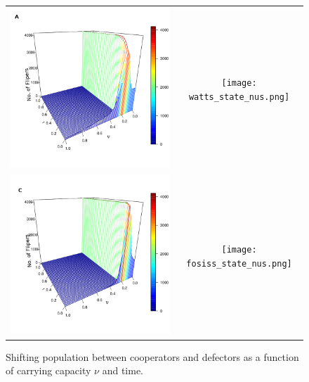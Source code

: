 \documentclass[11pt]{article}
\begin{document}
\begin{figure} [h!]
\begin{tabular}{cc}
\includegraphics[scale=0.28]{images/erdos_state_nus.png} & \texttt{[image: watts\_state\_nus.png]} \\
\includegraphics[scale=0.28]{images/barabasi_state_nus.png} & \texttt{[image: fosiss\_state\_nus.png]}
\end{tabular}
\caption{Shifting population between cooperators and defectors as a function of
  carrying capacity $\nu$ and time.}\label{state} 
\end{figure}
\end{document}
